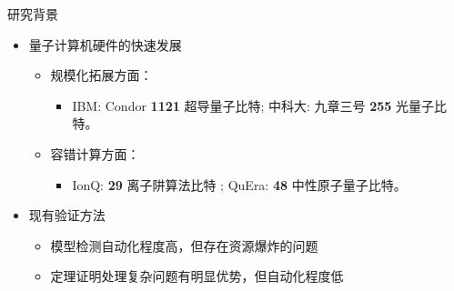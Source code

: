 \documentclass[aspectratio=1610]{ctexbeamer}
\begin{document}
\begin{frame}{研究背景}
    \begin{itemize}
        \item<1-> 量子计算机硬件的快速发展
        \begin{itemize}
            \item 规模化拓展方面：
            \begin{itemize}
                \item IBM: Condor \textbf{1121} 超导量子比特; 中科大: 九章三号 \textbf{255} 光量子比特。
            \end{itemize}
            \item 容错计算方面：
            \begin{itemize}
                \item IonQ: \textbf{29} 离子阱算法比特 ; QuEra:  \textbf{48} 中性原子量子比特。
            \end{itemize}
        \end{itemize}
        \item<2-> 现有验证方法
        \begin{itemize}
            \item 模型检测自动化程度高，但存在资源爆炸的问题
            \item 定理证明处理复杂问题有明显优势，但自动化程度低
        \end{itemize}
    \end{itemize}
\end{frame}
\end{document}
